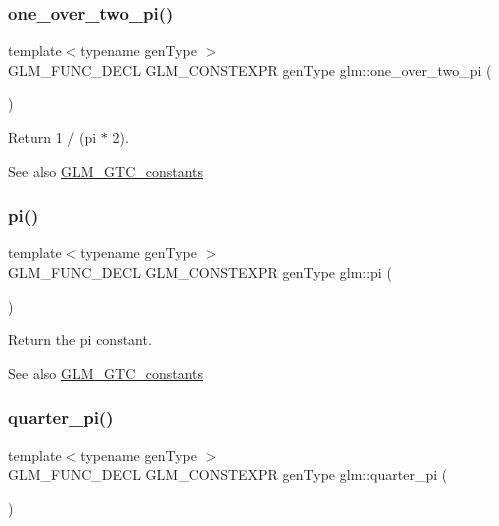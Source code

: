 \subsubsection{\texorpdfstring{one\+\_\+over\+\_\+two\+\_\+pi()}{one\_over\_two\_pi()}}
{\footnotesize\ttfamily template$<$typename gen\+Type $>$ \\
G\+L\+M\+\_\+\+F\+U\+N\+C\+\_\+\+D\+E\+CL G\+L\+M\+\_\+\+C\+O\+N\+S\+T\+E\+X\+PR gen\+Type glm\+::one\+\_\+over\+\_\+two\+\_\+pi (\begin{DoxyParamCaption}{ }\end{DoxyParamCaption})}

Return 1 / (pi $\ast$ 2). \begin{DoxySeeAlso}{See also}
\hyperlink{group__gtc__constants}{G\+L\+M\+\_\+\+G\+T\+C\+\_\+constants} 
\end{DoxySeeAlso}
\mbox{\label{group__gtc__constants_ga94bafeb2a0f23ab6450fed1f98ee4e45}} 
\subsubsection{\texorpdfstring{pi()}{pi()}}
{\footnotesize\ttfamily template$<$typename gen\+Type $>$ \\
G\+L\+M\+\_\+\+F\+U\+N\+C\+\_\+\+D\+E\+CL G\+L\+M\+\_\+\+C\+O\+N\+S\+T\+E\+X\+PR gen\+Type glm\+::pi (\begin{DoxyParamCaption}{ }\end{DoxyParamCaption})}

Return the pi constant. \begin{DoxySeeAlso}{See also}
\hyperlink{group__gtc__constants}{G\+L\+M\+\_\+\+G\+T\+C\+\_\+constants} 
\end{DoxySeeAlso}
\mbox{\label{group__gtc__constants_ga3c9df42bd73c519a995c43f0f99e77e0}} 
\subsubsection{\texorpdfstring{quarter\+\_\+pi()}{quarter\_pi()}}
{\footnotesize\ttfamily template$<$typename gen\+Type $>$ \\
G\+L\+M\+\_\+\+F\+U\+N\+C\+\_\+\+D\+E\+CL G\+L\+M\+\_\+\+C\+O\+N\+S\+T\+E\+X\+PR gen\+Type glm\+::quarter\+\_\+pi (\begin{DoxyParamCaption}{ }\end{DoxyParamCaption})}

